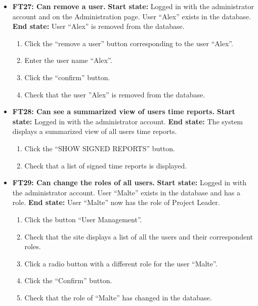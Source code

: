 \documentclass{article}
\begin{document}
\begin{itemize}
		
		\item \textbf{FT27: Can remove a user.} \newline
		\textbf{Start state:} Logged in with the administrator account and on the Administration page. User “Alex” exists in the database. \newline
		\textbf{End state:} User “Alex”  is removed from the database.
		\begin{enumerate}
			\item Click the “remove a user” button corresponding to the user “Alex”.
			\item Enter the user name “Alex”.
			\item Click the “confirm” button.
			\item Check that the user ”Alex” is removed from the database.
		\end{enumerate}
		
		
		\item \textbf{FT28: Can see a summarized view of users time reports.} \newline
		\textbf{Start state:} Logged in with the administrator account.  \newline
		\textbf{End state:} The system displays a summarized view of all users time reports.
		\begin{enumerate}
			\item Click the “SHOW SIGNED REPORTS” button.
			\item Check that a list of signed time reports is displayed.
		\end{enumerate}
		
		
		\item \textbf{FT29: Can change the roles of all users.} \newline
		\textbf{Start state:} Logged in with the administrator account. User “Malte” exists in the database and has a role.  \newline
		\textbf{End state:} User “Malte” now has the role of Project Leader.
		\begin{enumerate}
			\item Click the button “User Management”.
			\item Check that the site displays a list of all the users and their correspondent roles.
			\item Click a radio button with a different role for the user “Malte”.
			\item Click the “Confirm” button. 
			\item Check that the role of “Malte” has changed in the database.
		\end{enumerate}
		

\end{itemize}
\end{document}
